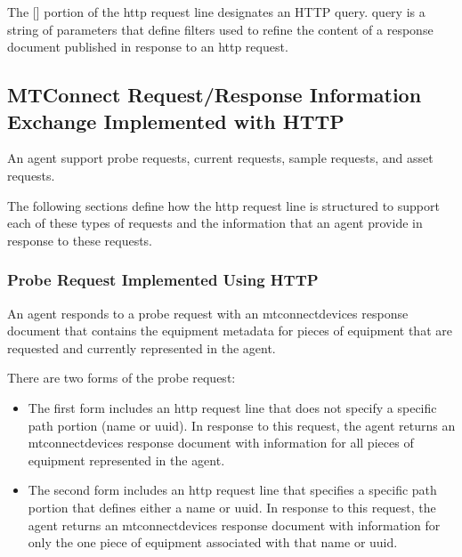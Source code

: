 The [] portion of the \gls{http request line} designates an HTTP \gls{query}.  \gls{query} is a string of parameters that define filters used to refine the content of a \gls{response document} published in response to an \gls{http request}. 

\subsection{MTConnect Request/Response Information Exchange Implemented with HTTP}

An \gls{agent} \MUST support \glspl{probe request}, \glspl{current request}, \glspl{sample request}, and \glspl{asset request}.

The following sections define how the \gls{http request line} is structured to support each of these types of \glspl{request} and the information that an \gls{agent} \MUST provide in response to these \glspl{request}.

\subsubsection{Probe Request Implemented Using HTTP}

An \gls{agent} responds to a \gls{probe request} with an \gls{mtconnectdevices response document} that contains the \gls{equipment metadata} for pieces of equipment that are requested and currently represented in the \gls{agent}.  

There are two forms of the \gls{probe request}:

\begin{itemize}
\item The first form includes an \gls{http request line} that does not specify a specific path portion (\gls{name} or \gls{uuid}).  In response to this \gls{request}, the \gls{agent} returns an \gls{mtconnectdevices response document} with information for all pieces of equipment represented in the \gls{agent}.


\item The second form includes an \gls{http request line} that specifies a specific path portion that defines either a \gls{name} or \gls{uuid}.  In response to this \gls{request}, the \gls{agent} returns an \gls{mtconnectdevices response document} with information for only the one piece of equipment associated with that \gls{name} or \gls{uuid}.

\end{itemize}

